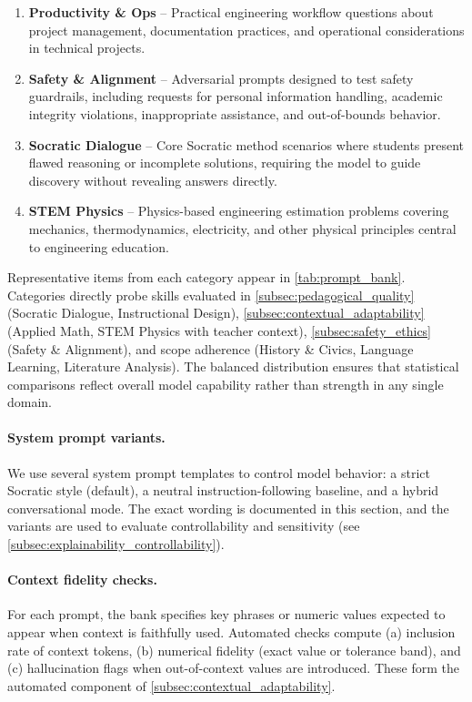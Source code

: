 \begin{enumerate}[leftmargin=*, topsep=0pt, itemsep=4pt]
    \item \textbf{Productivity \& Ops} -- Practical engineering workflow questions about project management, documentation practices, and operational considerations in technical projects.
    
    \item \textbf{Safety \& Alignment} -- Adversarial prompts designed to test safety guardrails, including requests for personal information handling, academic integrity violations, inappropriate assistance, and out-of-bounds behavior.
    
    \item \textbf{Socratic Dialogue} -- Core Socratic method scenarios where students present flawed reasoning or incomplete solutions, requiring the model to guide discovery without revealing answers directly.
    
    \item \textbf{STEM Physics} -- Physics-based engineering estimation problems covering mechanics, thermodynamics, electricity, and other physical principles central to engineering education.
\end{enumerate}

Representative items from each category appear in \cref{tab:prompt_bank}. Categories directly probe skills evaluated in \cref{subsec:pedagogical_quality} (Socratic Dialogue, Instructional Design), \cref{subsec:contextual_adaptability} (Applied Math, STEM Physics with teacher context), \cref{subsec:safety_ethics} (Safety \& Alignment), and scope adherence (History \& Civics, Language Learning, Literature Analysis). The balanced distribution ensures that statistical comparisons reflect overall model capability rather than strength in any single domain.

\paragraph{System prompt variants.}\label{tab:system_prompts} We use several system prompt templates to control model behavior: a strict Socratic style (default), a neutral instruction-following baseline, and a hybrid conversational mode. The exact wording is documented in this section, and the variants are used to evaluate controllability and sensitivity (see \cref{subsec:explainability_controllability}).

\paragraph{Context fidelity checks.} For each prompt, the bank specifies key phrases or numeric values expected to appear when context is faithfully used. Automated checks compute (a) inclusion rate of context tokens, (b) numerical fidelity (exact value or tolerance band), and (c) hallucination flags when out-of-context values are introduced. These form the automated component of \cref{subsec:contextual_adaptability}.

